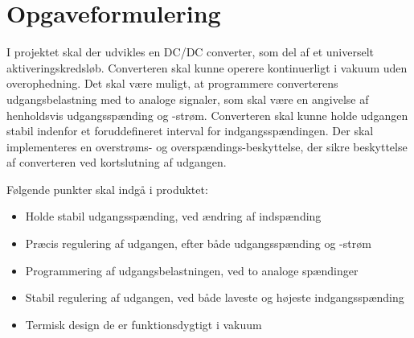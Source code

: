 

\chapter{Opgaveformulering}
I projektet skal der udvikles en DC/DC converter, som del af et universelt aktiveringskredsløb. Converteren skal kunne operere kontinuerligt i vakuum uden overophedning. Det skal være muligt, at programmere converterens udgangsbelastning med to analoge signaler, som skal være en angivelse af henholdsvis udgangsspænding og -strøm. Converteren skal kunne holde udgangen stabil indenfor et foruddefineret interval for indgangsspændingen. Der skal implementeres en overstrøms- og overspændings-beskyttelse, der sikre beskyttelse af converteren ved kortslutning af udgangen. 

\noindent Følgende punkter skal indgå i produktet:
\begin{itemize}
	\item Holde stabil udgangsspænding, ved ændring af indspænding
	\item Præcis regulering af udgangen, efter både udgangsspænding og -strøm
	\item Programmering af udgangsbelastningen, ved to analoge spændinger
	\item Stabil regulering af udgangen, ved både laveste og højeste indgangsspænding
	\item Termisk design de er funktionsdygtigt i vakuum 
\end{itemize}